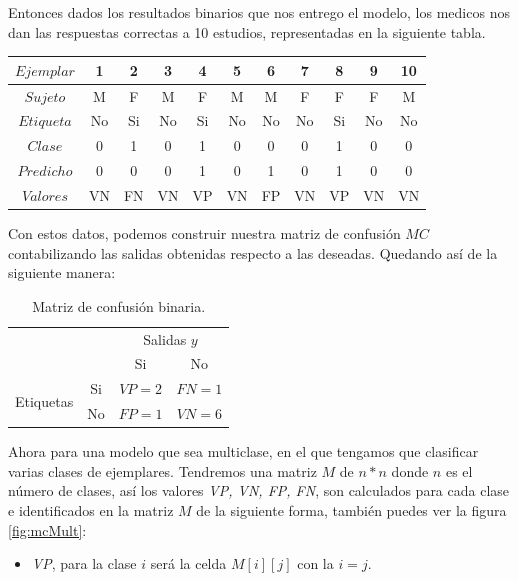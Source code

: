 \begin{description}
\begin{example}
   Entonces dados los resultados binarios que nos entrego el modelo, los medicos nos dan las respuestas correctas a 10
   estudios, representadas en la siguiente tabla.
 
   \begin{center}
     \begin{tabular}{c|cccccccccc}

      $Ejemplar$ & 1   & 2  & 3  & 4  & 5  & 6  & 7  & 8  & 9  & 10  \\ \hline
      $Sujeto$   & M   & F  & M  & F  & M  & M  & F  & F  & F  & M  \\ \hline
      $Etiqueta$ & No  & Si & No & Si & No & No & No & Si & No & No  \\ \hline
      $Clase$    & 0   & 1  & 0  & 1  & 0  & 0  & 0  & 1  & 0  & 0  \\ \hline
      $Predicho$ & 0   & 0  & 0  & 1  & 0  & 1  & 0  & 1  & 0  & 0  \\ \hline
      $Valores$  & VN  & FN & VN & VP & VN & FP & VN & VP & VN & VN  \\ \hline
   
     \end{tabular}
   \end{center}

   Con estos datos, podemos construir nuestra matriz de confusión $MC$ contabilizando las salidas obtenidas respecto a las deseadas. Quedando así de la siguiente manera:

   \begin{table}[H]
    \begin{center}
     \begin{tabular}{|c|c|c|c|}
     \cline{3-4}
     \multicolumn{2}{c|}{} & \multicolumn{2}{c|}{Salidas $y$} \\
     \cline{3-4}
     \multicolumn{2}{c|}{} & Si & No \\
     \hline
     \multirow{3}{*}{Etiquetas} & Si & $VP = 2$ & $FN = 1$ \\
     \cline{2-4}
     & No & $FP=1$ & $VN = 6$  \\
     \hline
     \end{tabular}
    \end{center}
    \caption{Matriz de confusión binaria.}
    \label{Table2}
   \end{table}

\label{ej:binario}
\end{example}
 
 
 Ahora para una modelo que sea multiclase, en el que tengamos que clasificar varias clases de ejemplares. Tendremos una matriz $M$ de $n * n$ donde $n$ es el número de clases, así los valores \emph{VP, VN, FP, FN}, son calculados para cada clase e identificados en la matriz $M$ de la siguiente forma, también puedes ver la figura \ref{fig:mcMult}:
 \begin{itemize}
  \item \emph{VP}, para la clase $i$ será la celda $M[i][j]$ con la $i = j$.
  

\end{itemize}
\end{description}
